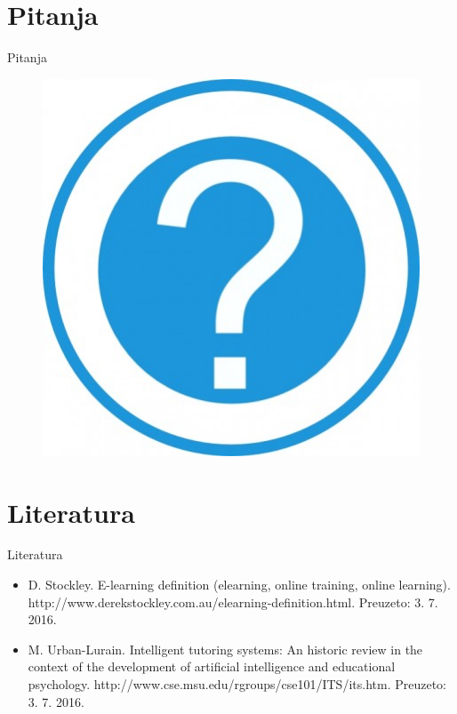 \documentclass[times, utf8, numeric]{beamer}
\begin{document}
\section{Pitanja}
\begin{frame}{Pitanja}
	\begin{figure}[pitanja]
		\centering
		\includegraphics[width=\textwidth,height=0.7\textheight,keepaspectratio]{img/pitanja.jpg}
		\label{fig:pit}
	\end{figure}
\end{frame}

\section{Literatura}
\begin{frame}{Literatura}
\begin{itemize}
	\item D. Stockley. E-learning definition (elearning, online training, online learning).
	http://www.derekstockley.com.au/elearning-definition.html. Preuzeto: 3. 7. 2016.
	\item
	M. Urban-Lurain. Intelligent tutoring systems: An historic review in the context
	of the development of artificial intelligence and educational psychology.
	http://www.cse.msu.edu/rgroups/cse101/ITS/its.htm. Preuzeto: 3. 7. 2016.
\end{itemize}
\end{frame}
\end{document}
